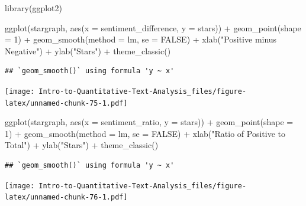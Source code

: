 \documentclass[
]{article}
\newenvironment{Shaded}{\begin{snugshade}}{\end{snugshade}}
\newcommand{\AttributeTok}[1]{\textcolor[rgb]{0.77,0.63,0.00}{#1}}
\newcommand{\ConstantTok}[1]{\textcolor[rgb]{0.00,0.00,0.00}{#1}}
\newcommand{\DecValTok}[1]{\textcolor[rgb]{0.00,0.00,0.81}{#1}}
\newcommand{\FunctionTok}[1]{\textcolor[rgb]{0.00,0.00,0.00}{#1}}
\newcommand{\NormalTok}[1]{#1}
\newcommand{\SpecialCharTok}[1]{\textcolor[rgb]{0.00,0.00,0.00}{#1}}
\newcommand{\StringTok}[1]{\textcolor[rgb]{0.31,0.60,0.02}{#1}}
\begin{document}
\begin{Shaded}
\begin{Highlighting}[]
\FunctionTok{library}\NormalTok{(ggplot2)}

\FunctionTok{ggplot}\NormalTok{(stargraph, }\FunctionTok{aes}\NormalTok{(}\AttributeTok{x =}\NormalTok{ sentiment\_difference, }\AttributeTok{y =}\NormalTok{ stars)) }\SpecialCharTok{+}
    \FunctionTok{geom\_point}\NormalTok{(}\AttributeTok{shape =} \DecValTok{1}\NormalTok{) }\SpecialCharTok{+} \FunctionTok{geom\_smooth}\NormalTok{(}\AttributeTok{method =}\NormalTok{ lm, }\AttributeTok{se =} \ConstantTok{FALSE}\NormalTok{) }\SpecialCharTok{+}
    \FunctionTok{xlab}\NormalTok{(}\StringTok{"Positive minus Negative"}\NormalTok{) }\SpecialCharTok{+} \FunctionTok{ylab}\NormalTok{(}\StringTok{"Stars"}\NormalTok{) }\SpecialCharTok{+} \FunctionTok{theme\_classic}\NormalTok{()}
\end{Highlighting}
\end{Shaded}

\begin{verbatim}
## `geom_smooth()` using formula 'y ~ x'
\end{verbatim}

\texttt{[image: Intro-to-Quantitative-Text-Analysis\_files/figure-latex/unnamed-chunk-75-1.pdf]}

\begin{Shaded}
\begin{Highlighting}[]
\FunctionTok{ggplot}\NormalTok{(stargraph, }\FunctionTok{aes}\NormalTok{(}\AttributeTok{x =}\NormalTok{ sentiment\_ratio, }\AttributeTok{y =}\NormalTok{ stars)) }\SpecialCharTok{+} \FunctionTok{geom\_point}\NormalTok{(}\AttributeTok{shape =} \DecValTok{1}\NormalTok{) }\SpecialCharTok{+}
    \FunctionTok{geom\_smooth}\NormalTok{(}\AttributeTok{method =}\NormalTok{ lm, }\AttributeTok{se =} \ConstantTok{FALSE}\NormalTok{) }\SpecialCharTok{+} \FunctionTok{xlab}\NormalTok{(}\StringTok{"Ratio of Positive to Total"}\NormalTok{) }\SpecialCharTok{+}
    \FunctionTok{ylab}\NormalTok{(}\StringTok{"Stars"}\NormalTok{) }\SpecialCharTok{+} \FunctionTok{theme\_classic}\NormalTok{()}
\end{Highlighting}
\end{Shaded}

\begin{verbatim}
## `geom_smooth()` using formula 'y ~ x'
\end{verbatim}

\texttt{[image: Intro-to-Quantitative-Text-Analysis\_files/figure-latex/unnamed-chunk-76-1.pdf]}
\end{document}
